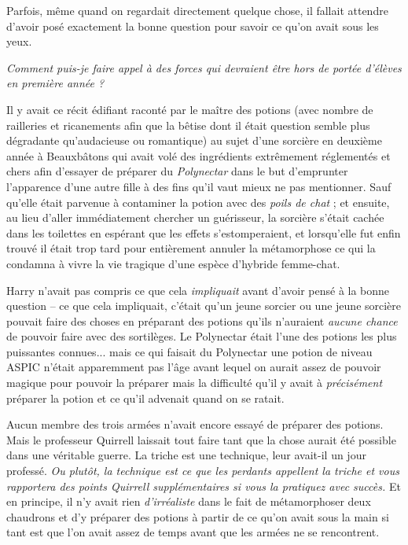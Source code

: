 Parfois, même quand on regardait directement quelque chose, il fallait attendre d'avoir posé exactement la bonne question pour savoir ce qu'on avait sous les yeux.

\emph{Comment puis-je faire appel à des forces qui devraient être hors de portée d'élèves en première année ?} 

Il y avait ce récit édifiant raconté par le maître des potions (avec nombre de railleries et ricanements afin que la bêtise dont il était question semble plus dégradante qu'audacieuse ou romantique) au sujet d'une sorcière en deuxième année à Beauxbâtons qui avait volé des ingrédients extrêmement réglementés et chers afin d'essayer de préparer du \emph{Polynectar } dans le but d'emprunter l'apparence d'une autre fille à des fins qu'il vaut mieux ne pas mentionner. Sauf qu'elle était parvenue à contaminer la potion avec des \emph{poils de chat } ; et ensuite, au lieu d'aller immédiatement chercher un guérisseur, la sorcière s'était cachée dans les toilettes en espérant que les effets s'estomperaient, et lorsqu'elle fut enfin trouvé il était trop tard pour entièrement annuler la métamorphose ce qui la condamna à vivre la vie tragique d'une espèce d'hybride femme-chat.

Harry n'avait pas compris ce que cela \emph{impliquait}  avant d'avoir pensé à la bonne question – ce que cela impliquait, c'était qu'un jeune sorcier ou une jeune sorcière pouvait faire des choses en préparant des potions qu'ils n'auraient \emph{aucune chance}  de pouvoir faire avec des sortilèges. Le Polynectar était l'une des potions les plus puissantes connues... mais ce qui faisait du Polynectar une potion de niveau ASPIC n'était apparemment pas l'âge avant lequel on aurait assez de pouvoir magique pour pouvoir la préparer mais la difficulté qu'il y avait à \emph{précisément}  préparer la potion et ce qu'il advenait quand on se ratait.

Aucun membre des trois armées n'avait encore essayé de préparer des potions. Mais le professeur Quirrell laissait tout faire tant que la chose aurait été possible dans une véritable guerre. La triche est une technique, leur avait-il un jour professé. \emph{Ou plutôt, la technique est ce que les perdants appellent la triche et vous rapportera des points Quirrell supplémentaires si vous la pratiquez avec succès.}  Et en principe, il n'y avait rien \emph{d'irréaliste}  dans le fait de métamorphoser deux chaudrons et d'y préparer des potions à partir de ce qu'on avait sous la main si tant est que l'on avait assez de temps avant que les armées ne se rencontrent.

